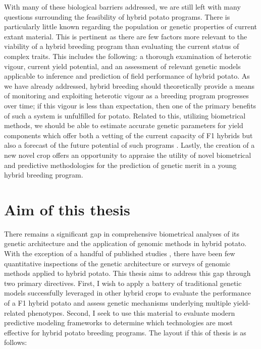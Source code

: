 \documentclass[
]{article}
\begin{document}
With many of these biological barriers addressed, we are still left with
many questions surrounding the feasibility of hybrid potato programs.
There is particularly little known regarding the population or genetic
properties of current extant material. This is pertinent as there are
few factors more relevant to the viability of a hybrid breeding program
than evaluating the current status of complex traits. This includes the
following: a thorough examination of heterotic vigour, current yield
potential, and an assessment of relevant genetic models applicable to
inference and prediction of field performance of hybrid potato. As we
have already addressed, hybrid breeding should theoretically provide a
means of monitoring and exploiting heterotic vigour as a breeding
program progresses over time; if this vigour is less than expectation,
then one of the primary benefits of such a system is unfulfilled for
potato. Related to this, utilizing biometrical methods, we should be
able to estimate accurate genetic parameters for yield components which
offer both a vetting of the current capacity of F1 hybrids but also a
forecast of the future potential of such programs
\autocite{Villanueva1993}. Lastly, the creation of a new novel crop
offers an opportunity to appraise the utility of novel biometrical and
predictive methodologies for the prediction of genetic merit in a young
hybrid breeding program.

\section{Aim of this thesis}\label{aim-of-this-thesis}

There remains a significant gap in comprehensive biometrical analyses of
its genetic architecture and the application of genomic methods in
hybrid potato. With the exception of a handful of published studies
\autocite{Jansky2018,Lindhout2011,Endelman2018}, there have been few
quantitative inspections of the genetic architecture or surveys of
genomic methods applied to hybrid potato. This thesis aims to address
this gap through two primary directives. First, I wish to apply a
battery of traditional genetic models successfully leveraged in other
hybrid crops to evaluate the performance of a F1 hybrid potato and
assess genetic mechanisms underlying multiple yield-related phenotypes.
Second, I seek to use this material to evaluate modern predictive
modeling frameworks to determine which technologies are most effective
for hybrid potato breeding programs. The layout if this of thesis is as
follows:
\end{document}
